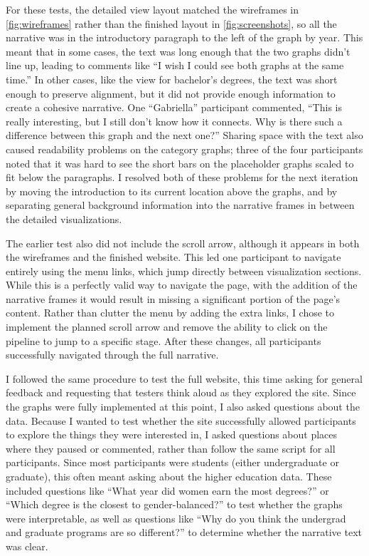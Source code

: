 For these tests, the detailed view layout matched the wireframes in \autoref{fig:wireframes} rather than the finished layout in \autoref{fig:screenshots}, so all the narrative was in the introductory paragraph to the left of the graph by year. This meant that in some cases, the text was long enough that the two graphs didn't line up, leading to comments like ``I wish I could see both graphs at the same time.'' In other cases, like the view for bachelor's degrees, the text was short enough to preserve alignment, but it did not provide enough information to create a cohesive narrative. One ``Gabriella'' participant commented, ``This is really interesting, but I still don't know how it connects. Why is there such a difference between this graph and the next one?'' Sharing space with the text also caused readability problems on the category graphs; three of the four participants noted that it was hard to see the short bars on the placeholder graphs scaled to fit below the paragraphs. I resolved both of these problems for the next iteration by moving the introduction to its current location above the graphs, and by separating general background information into the narrative frames in between the detailed visualizations.

The earlier test also did not include the scroll arrow, although it appears in both the wireframes and the finished website. This led one participant to navigate entirely using the menu links, which jump directly between visualization sections. While this is a perfectly valid way to navigate the page, with the addition of the narrative frames it would result in missing a significant portion of the page's content. Rather than clutter the menu by adding the extra links, I chose to implement the planned scroll arrow and remove the ability to click on the pipeline to jump to a specific stage. After these changes, all participants successfully navigated through the full narrative.

I followed the same procedure to test the full website, this time asking for general feedback and requesting that testers think aloud as they explored the site. Since the graphs were fully implemented at this point, I also asked questions about the data. Because I wanted to test whether the site successfully allowed participants to explore the things they were interested in, I asked questions about places where they paused or commented, rather than follow the same script for all participants. Since most participants were students (either undergraduate or graduate), this often meant asking about the higher education data. These included questions like ``What year did women earn the most degrees?'' or ``Which degree is the closest to gender-balanced?'' to test whether the graphs were interpretable, as well as questions like ``Why do you think the undergrad and graduate programs are so different?'' to determine whether the narrative text was clear.

